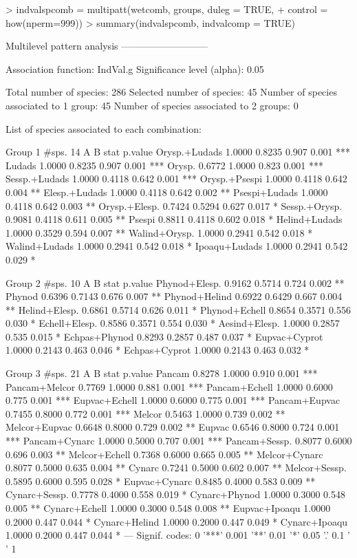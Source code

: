 \documentclass[11pt,a4paper]{article}
\begin{document}
\begin{Schunk}
\begin{Sinput}
> indvalspcomb = multipatt(wetcomb, groups, duleg = TRUE, 
+                        control = how(nperm=999))
> summary(indvalspcomb, indvalcomp = TRUE)
\end{Sinput}
\begin{Soutput}
 Multilevel pattern analysis
 ---------------------------

 Association function: IndVal.g
 Significance level (alpha): 0.05

 Total number of species: 286
 Selected number of species: 45 
 Number of species associated to 1 group: 45 
 Number of species associated to 2 groups: 0 

 List of species associated to each combination: 

 Group 1  #sps.  14 
                   A      B  stat p.value    
Orysp.+Ludads 1.0000 0.8235 0.907   0.001 ***
Ludads        1.0000 0.8235 0.907   0.001 ***
Orysp.        0.6772 1.0000 0.823   0.001 ***
Sessp.+Ludads 1.0000 0.4118 0.642   0.001 ***
Orysp.+Psespi 1.0000 0.4118 0.642   0.004 ** 
Elesp.+Ludads 1.0000 0.4118 0.642   0.002 ** 
Psespi+Ludads 1.0000 0.4118 0.642   0.003 ** 
Orysp.+Elesp. 0.7424 0.5294 0.627   0.017 *  
Sessp.+Orysp. 0.9081 0.4118 0.611   0.005 ** 
Psespi        0.8811 0.4118 0.602   0.018 *  
Helind+Ludads 1.0000 0.3529 0.594   0.007 ** 
Walind+Orysp. 1.0000 0.2941 0.542   0.018 *  
Walind+Ludads 1.0000 0.2941 0.542   0.018 *  
Ipoaqu+Ludads 1.0000 0.2941 0.542   0.029 *  

 Group 2  #sps.  10 
                   A      B  stat p.value   
Phynod+Elesp. 0.9162 0.5714 0.724   0.002 **
Phynod        0.6396 0.7143 0.676   0.007 **
Phynod+Helind 0.6922 0.6429 0.667   0.004 **
Helind+Elesp. 0.6861 0.5714 0.626   0.011 * 
Phynod+Echell 0.8654 0.3571 0.556   0.030 * 
Echell+Elesp. 0.8586 0.3571 0.554   0.030 * 
Aesind+Elesp. 1.0000 0.2857 0.535   0.015 * 
Echpas+Phynod 0.8293 0.2857 0.487   0.037 * 
Eupvac+Cyprot 1.0000 0.2143 0.463   0.046 * 
Echpas+Cyprot 1.0000 0.2143 0.463   0.032 * 

 Group 3  #sps.  21 
                   A      B  stat p.value    
Pancam        0.8278 1.0000 0.910   0.001 ***
Pancam+Melcor 0.7769 1.0000 0.881   0.001 ***
Pancam+Echell 1.0000 0.6000 0.775   0.001 ***
Eupvac+Echell 1.0000 0.6000 0.775   0.001 ***
Pancam+Eupvac 0.7455 0.8000 0.772   0.001 ***
Melcor        0.5463 1.0000 0.739   0.002 ** 
Melcor+Eupvac 0.6648 0.8000 0.729   0.002 ** 
Eupvac        0.6546 0.8000 0.724   0.001 ***
Pancam+Cynarc 1.0000 0.5000 0.707   0.001 ***
Pancam+Sessp. 0.8077 0.6000 0.696   0.003 ** 
Melcor+Echell 0.7368 0.6000 0.665   0.005 ** 
Melcor+Cynarc 0.8077 0.5000 0.635   0.004 ** 
Cynarc        0.7241 0.5000 0.602   0.007 ** 
Melcor+Sessp. 0.5895 0.6000 0.595   0.028 *  
Eupvac+Cynarc 0.8485 0.4000 0.583   0.009 ** 
Cynarc+Sessp. 0.7778 0.4000 0.558   0.019 *  
Cynarc+Phynod 1.0000 0.3000 0.548   0.005 ** 
Cynarc+Echell 1.0000 0.3000 0.548   0.008 ** 
Eupvac+Ipoaqu 1.0000 0.2000 0.447   0.044 *  
Cynarc+Helind 1.0000 0.2000 0.447   0.049 *  
Cynarc+Ipoaqu 1.0000 0.2000 0.447   0.044 *  
---
Signif. codes:  0 '***' 0.001 '**' 0.01 '*' 0.05 '.' 0.1 ' ' 1 
\end{Soutput}
\end{Schunk}
\end{document}
